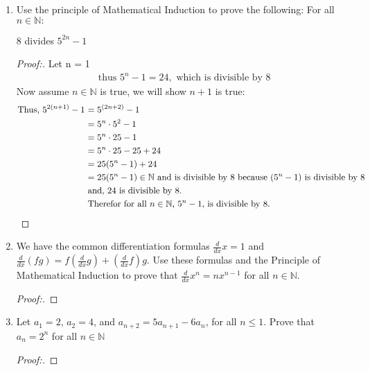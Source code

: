 \documentclass[11pt]{article}
\begin{document}
\begin{enumerate}
    \item Use the principle of Mathematical Induction to prove the following: For all $n \in \mathbb{N}:$
    \begin{center}
        8 divides $5^{2n} -1$
    \end{center}
        \begin{proof}[Proof:\nopunct]
            Let n = 1
            \begin{align*}
                \text{ thus $5^n-1 = 24,$ which is divisible by 8}
            \end{align*}
                Now assume $n \in \mathbb{N}$ is true, we will show $n+1$ is true:
            \begin{align*}
                \text{Thus, $5^{2(n+1)}-1 $ } 
                & \text{$ = 5^{(2n+2)} -1$} \\
                & \text{$ = 5^n\cdot 5^2 - 1$} \\
                & \text{$ = 5^n\cdot 25 - 1$} \\
                & \text{$ = 5^n\cdot 25 -25+24$} \\
                & \text{$ = 25(5^n -1)+24$} \\
                & \text{$ = 25(5^n - 1) \in \mathbb{N}$ and is divisible by 8 because $(5^n - 1)$ is divisible by 8} \\
                & \text{and, 24 is divisible by 8.} \\
                & \text{Therefor for all $n\in \mathbb{N}$, $5^n - 1,$ is divisible by 8.}
            \end{align*}
        \end{proof}
        
    \item We have the common differentiation formulas $\frac{d}{dx} x=1$ and $\frac{d}{dx}(fg)=f(\frac{d}{dx}g) + (\frac{d}{dx}f)g$. 
    \newline Use these formulas and the Principle of Mathematical Induction to prove that $\frac{d}{dx}x^n = nx^{n-1}$ for all $n \in \mathbb{N}$.
        \begin{proof}[Proof:\nopunct]
        \end{proof}
        
    \item Let $a_1=2$, $a_2=4$, and $a_{n+2} = 5a_{n+1} - 6a_n$, for all $n \leq 1.$ Prove that $a_n = 2^n$ for all $n \in \mathbb{N}$
        \begin{proof}[Proof:\nopunct]
        \end{proof}
        

\end{enumerate}
\end{document}
